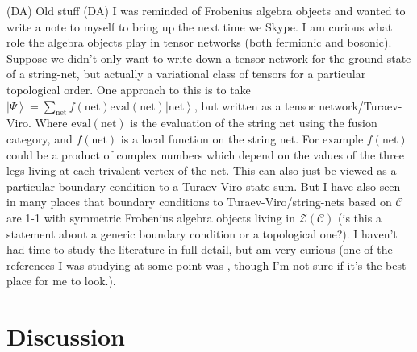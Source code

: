 \documentclass[12pt,a4paper]{article}
\newcommand{\mcz}{\mathcal{Z}}
\newcommand{\mcc}{\mathcal{C}}
\newcommand{\ket}[1]{\ensuremath{\left|#1\right\rangle}}
\newcommand{\dave}[1]{{\color{ao(english)}\footnotesize{(DA) #1}}}
\begin{document}
\dave{Old stuff}
\dave{
I was reminded of Frobenius algebra objects and wanted to write a note to myself to bring up the next time we Skype.
I am curious what role the algebra objects play in tensor networks (both fermionic and bosonic).
Suppose we didn't only want to write down a tensor network for the ground state of a string-net, 
but actually a variational class of tensors for a particular topological order.
One approach to this is to take $\ket{\Psi} = \sum_{\text{net}} f(\text{net}) \text{eval}(\text{net}) \ket{\text{net}}$, but written as a tensor network/Turaev-Viro. 
Where $\text{eval}(\text{net})$ is the evaluation of the string net using the fusion category, 
and $f(\text{net})$ is a local function on the string net.
For example $f(\text{net})$ could be a product of complex numbers which depend on the values of the three legs living at each trivalent vertex of the net. 
This can also just be viewed as a particular boundary condition to a Turaev-Viro state sum.
But I have also seen in many places that boundary conditions to Turaev-Viro/string-nets 
based on $\mcc$ are 1-1 with symmetric Frobenius algebra objects living in $\mcz(\mcc)$ (is this a statement about a generic boundary condition or a topological one?).
I haven't had time to study the literature in full detail, but am very curious 
(one of the references I was studying at some point was \cite{Schauenburg2001}, 
though I'm not sure if it's the best place for me to look.).
}

 
\section{Discussion} \label{discussion}

\end{document}
